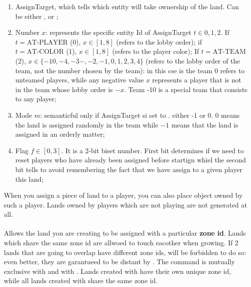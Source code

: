 \begin{appendices}
    \begin{enumerate}
        \item AssignTarget, which tells which entity will take ownership of the land. Can be either ,  or ;
        \item Number $x$: represents the specific entity Id of AssignTarget $t \in {0,1,2}$. If $t=\mbox{AT-PLAYER}$ (0), $x \in [1,8]$ (refers to the lobby order); if $t=\mbox{AT-COLOR}$ (1), $x \in [1,8]$ (refers to the player color); If $t=\mbox{AT-TEAM}$ (2), $x \in \{-10,-4,-3-,-2,-1,0,1,2,3,4\}$ (refers to the lobby order of the team, not the number chosen by the team): in this cse is the team 0 refers to unteamed players, while any negative value $x$ represents a player that is not in the team whose lobby order is $-x$. Team -10 is a special team that consists to any player;
        \item Mode $m$: semanticful only if AssignTarget si set to . either -1 or 0. $0$ means the land is assigned randomly in the team while $-1$ means that the land is assigned in an orderly matter;
        \item Flag $f \in [0,3]$. It is a 2-bit biset number. First bit determines if we need to reset players who have already been assigned before startign whiel the second bit tells to avoid remembering the fact that we have assign to a given player this land;
    \end{enumerate}

    When you assign a piece of land to a player, you can also place object owned by such a player. Lands owned by players which are not playing are not generated at all. 

    \paragraph{}

    Allows the land you are creating to be assigned with a particular \textbf{zone id}. Lands which share the same zone id are allwoed to touch eacother when growing. If 2 lands that are going to overlap have different zone ids, will be forbidden to do so: even better, they are garantueed to be distant by . The command is mutually exclusive with  and with . Lands created with  have their own unique zone id, while all lands created with  share the same zone id.


\end{appendices}
